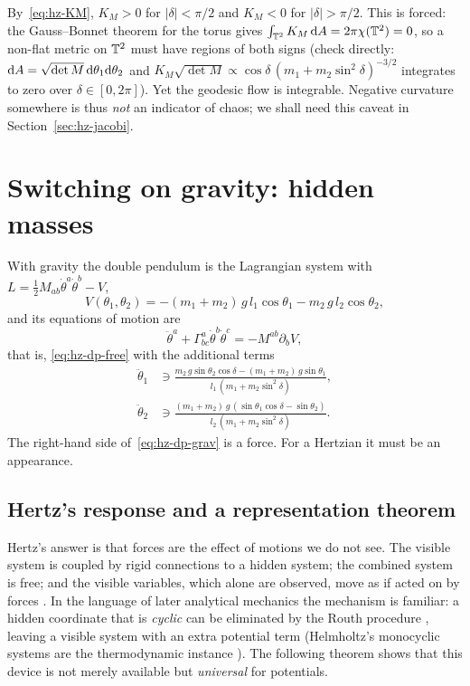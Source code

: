 \begin{remark}\label{rem:hz-gb-free}
By~\eqref{eq:hz-KM}, $K_M>0$ for $|\delta|<\pi/2$ and $K_M<0$ for $|\delta|>\pi/2$.
This is forced: the Gauss--Bonnet theorem for the torus gives
$\int_{\mathbb{T}^2}K_M\,\mathrm{d} A=2\pi\chi(\mathbb{T}^2)=0$, so a non-flat metric on $\mathbb{T}^2$ must
have regions of both signs (check directly: $\mathrm{d} A=\sqrt{\det M}\,\mathrm{d}\theta_1\mathrm{d}\theta_2$
and $K_M\sqrt{\det M}\propto\cos\delta\,(m_1+m_2\sin^2\delta)^{-3/2}$ integrates to zero
over $\delta\in[0,2\pi]$). Yet the geodesic flow is integrable. Negative curvature somewhere is thus
\emph{not} an indicator of chaos; we shall need this caveat in
Section~\ref{sec:hz-jacobi}.
\end{remark}

\section{Switching on gravity: hidden masses}
\label{sec:hz-hidden}

With gravity the double pendulum is the Lagrangian system with
$L=\tfrac12M_{ab}\dot\theta^a\dot\theta^b-V$,
\begin{equation}\label{eq:hz-V}
  V(\theta_1,\theta_2)=-(m_1+m_2)\,g\,l_1\cos\theta_1-m_2\,g\,l_2\cos\theta_2 ,
\end{equation}
and its equations of motion are
\begin{equation}\label{eq:hz-dp-grav}
  \ddot\theta^a+\Gamma^a_{bc}\dot\theta^b\dot\theta^c=-M^{ab}\partial_bV ,
\end{equation}
that is, \eqref{eq:hz-dp-free} with the additional terms
\begin{align*}
  \ddot\theta_1&\ni\frac{m_2\,g\sin\theta_2\cos\delta-(m_1+m_2)\,g\sin\theta_1}{l_1\,(m_1+m_2\sin^2\delta)},\\
  \ddot\theta_2&\ni\frac{(m_1+m_2)\,g\,(\sin\theta_1\cos\delta-\sin\theta_2)}{l_2\,(m_1+m_2\sin^2\delta)} .
\end{align*}
The right-hand side of~\eqref{eq:hz-dp-grav} is a force. For a Hertzian it
must be an appearance.

\subsection{Hertz's response and a representation theorem}

Hertz's answer is that forces are the effect of motions we do not see. The
visible system is coupled by rigid connections to a hidden system; the
combined system is free; and the visible variables, which alone are
observed, move as if acted on by forces \cite{hdp:hertz1894,hdp:lutzen2005}.
In the language of later analytical mechanics the mechanism is familiar: a
hidden coordinate that is \emph{cyclic} can be eliminated by the Routh
procedure \cite{hdp:routh1877}, leaving a visible system with an extra
potential term (Helmholtz's monocyclic systems are the thermodynamic
instance \cite{hdp:helmholtz1884}). The following theorem shows that this
device is not merely available but \emph{universal} for potentials.

